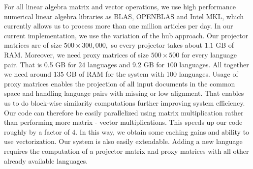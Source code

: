 For all linear algebra matrix and vector operations, we use high performance numerical 
linear algebra libraries as BLAS, OPENBLAS and Intel MKL, which currently allows 
us to process more than one million articles per day.
In our current implementation, we use the variation of the hub approach. Our projector 
matrices are of size $500\times 300,000,$ so every projector takes about $1.1$ GB of RAM. 
Moreover, we need proxy matrices of size $500\times500$ for every language pair. That 
is 0.5 GB for $24$ languages and $9.2$ GB for $100$ languages. All together we need 
around 135 GB of RAM for the system with 100 languages.
Usage of proxy matrices enables the projection of all input documents in the common 
space and handling language pairs with missing or low alignment. That enables us to 
do block-wise similarity computations further improving system efficiency. Our code 
can therefore be easily parallelized using matrix multiplication rather than performing 
more matrix - vector multiplications. This speeds up our code roughly by a factor of 4. In 
this way, we obtain some caching gains and ability to use vectorization.
Our system is also easily extendable. Adding a new language requires the computation of 
a projector matrix and proxy matrices with all other already available languages.